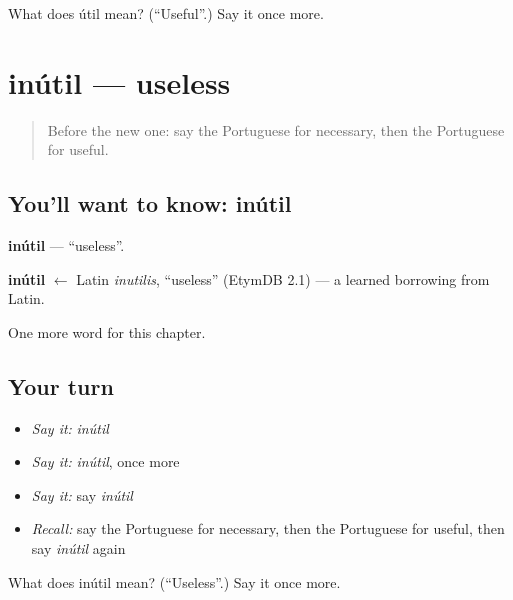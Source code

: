 \begin{tcolorbox}[breakable,colback=teal!4,colframe=teal!35!black,title={Before you move on}]
What does útil mean? (\textquotedblleft{}Useful\textquotedblright{}.) Say it once more.
\end{tcolorbox}
\section[inútil]{inútil — useless}

\label{lesson:PT-C154-inutil}



\begin{quote}
Before the new one: say the Portuguese for necessary, then the Portuguese for useful.
\end{quote}

\subsection*{You'll want to know: inútil}
\textbf{inútil} — \textquotedblleft{}useless\textquotedblright{}.

\begin{cousinweb}
\textbf{inútil} $\leftarrow$ Latin \emph{inutilis}, \textquotedblleft{}useless\textquotedblright{} (EtymDB 2.1) — a learned borrowing from Latin.
\end{cousinweb}

\begin{grammarlens}[title={What you've built}]
One more word for this chapter.
\end{grammarlens}

\subsection*{Your turn}
\begin{itemize}
\raggedright
  \item \emph{Say it:} \emph{inútil}
  \item \emph{Say it:} \emph{inútil}, once more
  \item \emph{Say it:} say \emph{inútil}
  \item \emph{Recall:} say the Portuguese for necessary, then the Portuguese for useful, then say \emph{inútil} again
\end{itemize}

\begin{tcolorbox}[breakable,colback=teal!4,colframe=teal!35!black,title={Before you move on}]
What does inútil mean? (\textquotedblleft{}Useless\textquotedblright{}.) Say it once more.
\end{tcolorbox}
